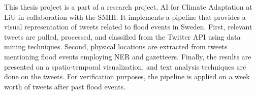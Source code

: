 This thesis project is a part of a research project, AI for Climate Adaptation
\cite{nesetAI4ClimateAdaptation} at \ac{LiU} in collaboration with the \ac{SMHI}. It implements a
pipeline that provides a visual representation of tweets related to flood events in Sweden. First,
relevant tweets are pulled, processed, and classified from the Twitter API using data mining
techniques. Second, physical locations are extracted from tweets mentioning flood events employing
\ac{NER} and gazetteers. Finally, the results are presented on a spatio-temporal visualization, and
text analysis techniques are done on the tweets. For verification purposes, the pipeline is applied on a
week worth of tweets after past flood events.
